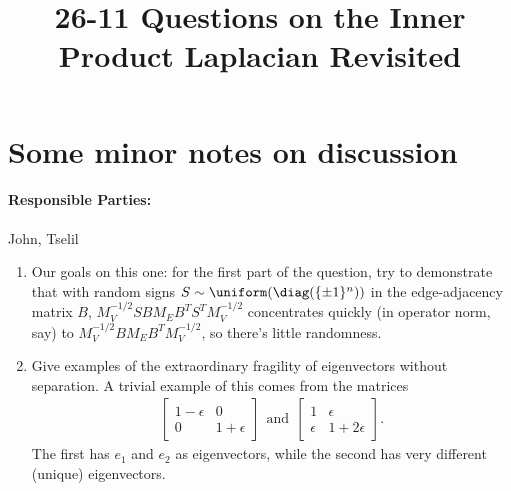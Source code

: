 \documentclass[11pt]{article}
\begin{document}
\title{26-11 Questions on the Inner Product Laplacian Revisited}

\maketitle

\section{Some minor notes on discussion}

\paragraph{Responsible Parties:} John, Tselil

\begin{enumerate}[1.]
\item Our goals on this one: for the first part of the question, try to
  demonstrate that with random signs $S \sim \uniform(\diag(\{\pm
  1\}^n))$ in the edge-adjacency matrix $B$, $M_V^{-1/2} S B M_E B^T S^T
  M_V^{-1/2}$ concentrates quickly (in operator norm, say) to
  $M_V^{-1/2} B M_E B^T M_V^{-1/2}$, so there's little randomness.
\item Give examples of the extraordinary fragility of eigenvectors without
  separation.
  A trivial example of this comes from the matrices
  \begin{align*}
    \left[\begin{matrix} 1 - \epsilon & 0 \\ 0 & 1 + \epsilon
      \end{matrix} \right]
    ~~ \mbox{and} ~~
    \left[\begin{matrix} 1 & \epsilon \\ \epsilon & 1 + 2 \epsilon
        \end{matrix}\right].
  \end{align*}
  The first has $e_1$ and $e_2$ as eigenvectors, while the second has
  very different (unique) eigenvectors.
\end{enumerate}
\end{document}
